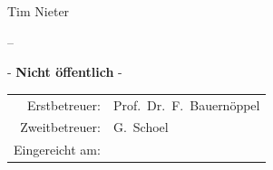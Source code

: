 \begin{titlepage}
\begin{large}
\begin{center}
			\begin{Large}
			Tim Nieter\\
			\end{Large}
			
			\vspace{.5cm}
			
			{\thesisopening} -- {\thesisclosing}
			
			\vfill
			
			- \textbf{Nicht öffentlich} -
			
			\vfill
			
			\begin{tabular}{rl}
			 Erstbetreuer:   & Prof.\ Dr.\ F.\ Bauernöppel\\
			 Zweitbetreuer:   & G.\ Schoel\\
			 Eingereicht am:   & {\thesisrelease}
			\end{tabular}
		\end{center}
	\end{large}
\end{titlepage}


%